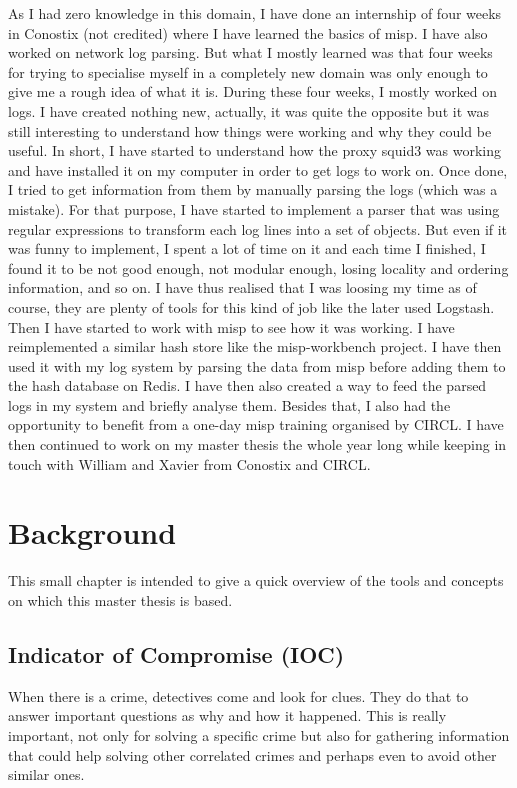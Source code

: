 \documentclass{eplmastersthesis}
\begin{document}
As I had zero knowledge in this domain, I have done an internship of four weeks in Conostix (not credited) where I have learned the basics of \gls{misp}. I have also worked on network log parsing. But what I mostly learned was that four weeks for trying to specialise myself in a completely new domain was only enough to give me a rough idea of what it is.
During these four weeks, I mostly worked on logs. I have created nothing new, actually, it was quite the opposite but it was still interesting to understand how things were working and why they could be useful. 
In short, I have started to understand how the proxy squid3 was working and have installed it on my computer in order to get logs to work on. Once done, I tried to get information from them by manually parsing the logs (which was a mistake). For that purpose, I have started to implement a parser that was using regular expressions to transform each log lines into a set of objects. But even if it was funny to implement, I spent a lot of time on it and each time I finished, I found it to be not good enough, not modular enough, losing locality and ordering information, and so on. I have thus realised that I was loosing my time as of course, they are plenty of tools for this kind of job like the later used Logstash. Then I have started to work with \gls{misp} to see how it was working. I have reimplemented a similar hash store like the misp-workbench project. I have then used it with my log system by parsing the data from \gls{misp} before adding them to the hash database on Redis. I have then also created a way to feed the parsed logs in my system and briefly analyse them.
Besides that, I also had the opportunity to benefit from a one-day \gls{misp} training organised by CIRCL.
I have then continued to work on my master thesis the whole year long while keeping in touch with William and Xavier from Conostix and CIRCL.

\chapter{Background}
This small chapter is intended to give a quick overview of the tools and concepts on which this master thesis is based.

\section{Indicator of Compromise (IOC)}
When there is a crime, detectives come and look for clues. They do that to answer important questions as why and how it happened. This is really important, not only for solving a specific crime but also for gathering information that could help solving other correlated crimes and perhaps even to avoid other similar ones.\\
\end{document}
